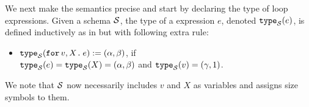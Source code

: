 We next make the semantics precise and start by
declaring the type of loop expressions.
Given a schema $\mathcal{S}$, the type of a \langfor expression $e$, denoted $\texttt{type}_{\mathcal{S}}(e)$, is defined inductively as in \lang but with following extra rule:
\begin{itemize}
\item $\texttt{type}_{\mathcal{S}}(\texttt{for}\, v,X \texttt{.}\, e) := (\alpha,\beta)$, if \\
$\texttt{type}_{\mathcal{S}}(e)=\texttt{type}_{\mathcal{S}}(X) =(\alpha,\beta)$ and $\texttt{type}_{\mathcal{S}}(v) = (\gamma,1)$.
\end{itemize}
We note that $\mathcal{S}$ now necessarily includes $v$ and $X$ as variables and assigns size symbols to them.
